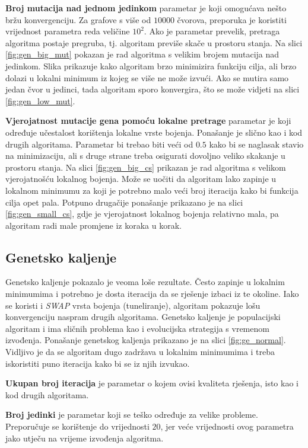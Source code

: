 \documentclass[times, utf8, diplomski, numeric]{fer}
\begin{document}
\textbf{Broj mutacija nad jednom jedinkom} parametar je koji omogućava nešto bržu konvergenciju. Za grafove s više od $10000$ čvorova, preporuka je koristiti vrijednost parametra reda veličine $10^2$. Ako je parametar prevelik, pretraga algoritma postaje pregruba, tj. algoritam previše skače u prostoru stanja. Na slici \ref{fig:gen_big_mut} pokazan je rad algoritma s velikim brojem mutacija nad jedinkom. Slika prikazuje kako algoritam brzo minimizira funkciju cilja, ali brzo dolazi u lokalni minimum iz kojeg se više ne može izvući. Ako se mutira samo jedan čvor u jedinci, tada algoritam sporo konvergira, što se može vidjeti na slici \ref{fig:gen_low_mut}.

\textbf{Vjerojatnost mutacije gena pomoću lokalne pretrage} parametar je koji određuje učestalost korištenja lokalne vrste bojenja. Ponašanje je slično kao i kod drugih algoritama. Parametar bi trebao biti veći od $0.5$ kako bi se naglasak stavio na minimizaciju, ali s druge strane treba osigurati dovoljno veliko skakanje u prostoru stanja. Na slici \ref{fig:gen_big_cs} prikazan je rad algoritma s velikom vjerojatnošću lokalnog bojenja. Može se uočiti da algoritam lako zapinje u lokalnom minimumu za koji je potrebno malo veći broj iteracija kako bi funkcija cilja opet pala. Potpuno drugačije ponašanje prikazano je na slici \ref{fig:gen_small_cs}, gdje je vjerojatnost lokalnog bojenja relativno mala, pa algoritam radi male promjene iz koraka u korak.

\subsection{Genetsko kaljenje}

Genetsko kaljenje pokazalo je veoma loše rezultate. Često zapinje u lokalnim minimumima i potrebno je dosta iteracija da se rješenje izbaci iz te okoline. Iako se koristi i \emph{SWAP} vrsta bojenja (tuneliranje), algoritam pokazuje lošu konvergenciju naspram drugih algoritama. Genetsko kaljenje je populacijski algoritam i ima sličnih problema kao i evolucijska strategija s vremenom izvođenja. Ponašanje genetskog kaljenja prikazano je na slici \ref{fig:ge_normal}. Vidljivo je da se algoritam dugo zadržava u lokalnim minimumima i treba iskoristiti puno iteracija kako bi se iz njih izvukao.

\textbf{Ukupan broj iteracija} je parametar o kojem ovisi kvaliteta rješenja, isto kao i kod drugih algoritama.

\textbf{Broj jedinki} je parametar koji se teško određuje za velike probleme. Preporučuje se korištenje do vrijednosti $20$, jer veće vrijednosti ovog parametra jako utječu na vrijeme izvođenja algoritma.
\end{document}
